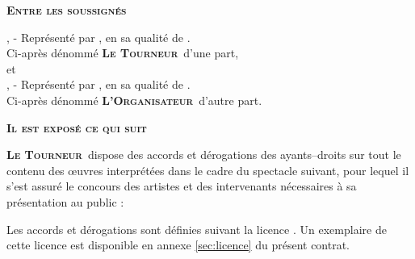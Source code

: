 \documentclass[a4paper,10pt]{article}
\title{\TitreDocument{} \no \ContratNumero{}}
\author{\TourneurRaisonSociale}
\newcommand{\PR}{\textbf{\textsc{Le Tourneur}}}
\newcommand{\OR}{\textbf{\textsc{L'Organisateur}}}
\begin{document}
\maketitle
\thispagestyle{fancy} {\noindent\large\textbf{\textsc{Entre les
      soussign\'es}} \vspace{0.3cm} }

\noindent\emph{{\large \TourneurRaisonSociale{}}}\newline
\TourneurAdresse{},\newline \TourneurCodePostal{} \TourneurVille{} -
\TourneurPays{}\newline \emph{\TourneurTelephone{}}\newline
\TourneurNumeroSIRET{}\newline \TourneurLicencesEntrepreneur{}\newline
Repr\'esent\'e par \emph{\TourneurRepresentantNom}, en sa qualit\'e de \emph{\TourneurRepresentantQualite{}}.\\
Ci-apr\`es d\'enomm\'e \PR\ d'une part,\\

et\\

\noindent\emph{\large \OrganisateurRaisonSociale{}}\newline
\OrganisateurAdresse{},\newline \OrganisateurCodePostal{}
\OrganisateurVille{} - \OrganisateurPays{}\newline
\emph{\OrganisateurTelephone{}}\newline
\OrganisateurNumeroSIRET{}\newline
\OrganisateurLicencesEntrepreneur{}\newline
\noindent Repr\'esent\'e par \emph{\OrganisateurRepresentantNom{}}, en sa qualit\'e de \emph{\OrganisateurRepresentantQualite{}}.\\
Ci-apr\`es d\'enomm\'e \OR\ d'autre part.\\
\vspace{.5cm}
\begin{center}
    \large \textbf{\textsc{Il est expos\'e ce qui suit}}
\end{center}

\PR\ dispose des accords et d\'erogations des ayants--droits
\emph{\OrganisateurPays{}} sur tout le contenu des \oe uvres
interpr\'et\'ees dans le cadre du spectacle suivant, pour lequel il
s'est assur\'e le concours des artistes et des intervenants
n\'ecessaires \`a sa pr\'esentation au public :
\begin{center}
    \textbf{\textsc{\SpectacleNom{}}}
\end{center}
Les accords et d\'erogations sont d\'efinies suivant la licence
\emph{\SpectacleLicenceLibreNom{}}. Un exemplaire de cette licence est
disponible en annexe \vref{sec:licence} du pr\'esent contrat.
\end{document}
